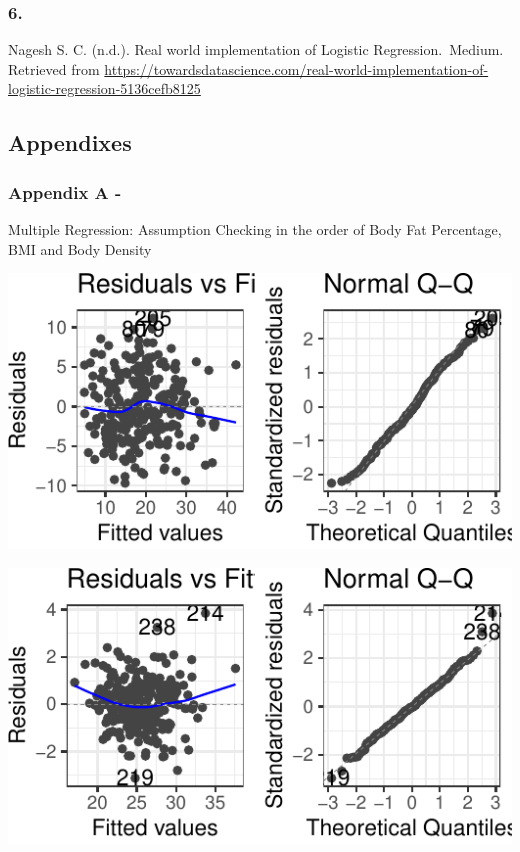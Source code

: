 \documentclass[a4paper,9pt,twocolumn,twoside,]{pinp}
\begin{document}
\hypertarget{section-5}{%
\subsubsection{6.}\label{section-5}}

Nagesh S. C. (n.d.). Real world implementation of Logistic
Regression.~Medium. Retrieved from
\url{https://towardsdatascience.com/real-world-implementation-of-logistic-regression-5136cefb8125}

\hypertarget{appendixes}{%
\subsection{Appendixes}\label{appendixes}}

\hypertarget{appendix-a--}{%
\subsubsection{Appendix A -}\label{appendix-a--}}

Multiple Regression: Assumption Checking in the order of Body Fat
Percentage, BMI and Body Density

\begin{center}\includegraphics{Executive_Report_files/figure-latex/unnamed-chunk-5-1} \end{center}

\begin{center}\includegraphics{Executive_Report_files/figure-latex/unnamed-chunk-5-2} \end{center}
\end{document}
